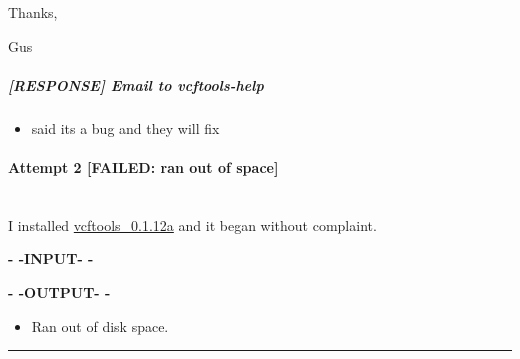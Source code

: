 \documentclass[letterpaper]{scrartcl}
\newenvironment{Shaded}{}{}
\newcommand{\KeywordTok}[1]{\textcolor[rgb]{0.00,0.44,0.13}{\textbf{{#1}}}}
\newcommand{\StringTok}[1]{\textcolor[rgb]{0.25,0.44,0.63}{{#1}}}
\newcommand{\OtherTok}[1]{\textcolor[rgb]{0.00,0.44,0.13}{{#1}}}
\newcommand{\NormalTok}[1]{{#1}}
\begin{document}
Thanks,

Gus

\subparagraph{{[}RESPONSE{]} Email to
vcftools-help}\label{response-email-to-vcftools-help}

\begin{itemize}
\itemsep1pt\parskip0pt
\item
  said its a bug and they will fix
\end{itemize}

\paragraph{Attempt 2 {[}FAILED: ran out of
space{]}}\label{attempt-2-failed-ran-out-of-space}

~\\ I installed
\href{file:///home/gus/remote_mounts/louise/scripts/installs/install_vcftools_0.1.12a.sh}{vcftools\_0.1.12a}
and it began without complaint.

\textbf{- -INPUT- -}

\begin{Shaded}
\end{Shaded}

\textbf{- -OUTPUT- -}

\begin{itemize}
\itemsep1pt\parskip0pt
\item
  Ran out of disk space.
\end{itemize}

\begin{center}\rule{0.5\linewidth}{\linethickness}\end{center}

\newpage
\end{document}
